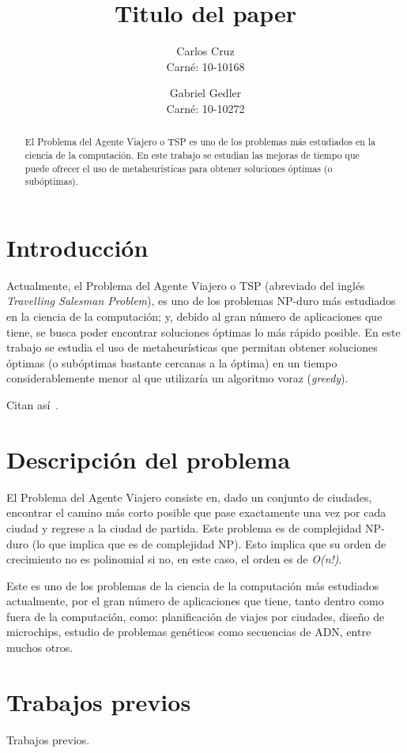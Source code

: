 \documentclass{ci5652}
\title{Titulo del paper}
\author{Carlos Cruz\\
Carné: 10-10168
        \and
        Gabriel Gedler\\
Carné: 10-10272}
\begin{document}
\thispagestyle{empty}
\maketitle


\begin{abstract}
El Problema del Agente Viajero o TSP es uno de los problemas más estudiados en la ciencia de la computación. En este trabajo se estudian las mejoras de tiempo que puede ofrecer el uso de metaheurísticas para obtener soluciones óptimas (o subóptimas).
\end{abstract}

\section{Introducción}
Actualmente, el Problema del Agente Viajero o TSP (abreviado del inglés \textit{Travelling Salesman Problem}), es uno de los problemas NP-duro más estudiados en la ciencia de la computación; y, debido al gran número de aplicaciones que tiene, se busca poder encontrar soluciones óptimas lo más rápido posible. 
En este trabajo se estudia el uso de metaheurísticas que permitan obtener soluciones óptimas (o subóptimas bastante cercanas a la óptima) en un tiempo considerablemente menor al que utilizaría un algoritmo voraz (\textit{greedy}).

Citan así~\cite{so2005}.

\section{Descripción del problema}
El Problema del Agente Viajero consiste en, dado un conjunto de ciudades, encontrar el camino más corto posible que pase exactamente una vez por cada ciudad y regrese a la ciudad de partida. Este problema es de complejidad NP-duro (lo que implica que es de complejidad NP). Esto implica que su orden de crecimiento no es polinomial si no, en este caso, el orden es de \textit{O(n!)}.

Este es uno de los problemas de la ciencia de la computación más estudiados actualmente, por el gran número de aplicaciones que tiene, tanto dentro como fuera de la computación, como: planificación de viajes por ciudades, diseño de microchips, estudio de problemas genéticos como secuencias de ADN, entre muchos otros.


\section{Trabajos previos}
Trabajos previos.
\end{document}
